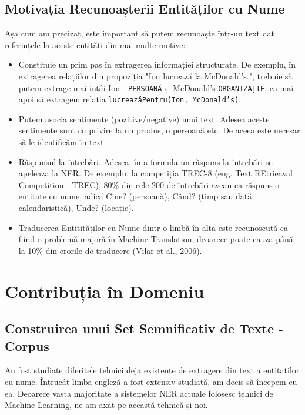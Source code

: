 \subsection{Motivația Recunoașterii Entităților cu Nume}

Așa cum am precizat, este important să putem recunoaște într-un text dat referințele la aceste entități din mai multe motive:

\begin{itemize}
\item Constituie un prim pas în extragerea informației structurate. De exemplu, în extragerea relațiilor din propoziția "Ion lucrează la McDonald's.", trebuie să putem extrage mai intâi Ion - \texttt{PERSOANĂ} și McDonald's \texttt{ORGANIZAȚIE}, ca mai apoi să extragem relația \texttt{lucreazăPentru(Ion, McDonald's)}.
\item Putem asocia sentimente (pozitive/negative) unui text. Adesea aceste sentimente sunt cu privire la un produs, o persoană etc. De aceea este necesar să le identificăm în text.
\item Răspunsul la întrebări. Adesea, în a formula un răspuns la întrebări se apelează la NER. De exemplu, la competiția TREC-8 (eng. Text REtrieaval Competition - TREC), 80\% din cele 200 de întrebări aveau ca răspuns o entitate cu nume, adică Cine? (persoană), Când? (timp sau dată calendaristică), Unde? (locație).\cite{trec8}
\item Traducerea Entitităților cu Nume dintr-o limbă în alta este recunoscută ca fiind o problemă majoră în Machine Translation, deoarece poate cauza până la 10\% din erorile de traducere (Vilar et al., 2006).\cite{vilar2006}
\end{itemize}

\section{Contribuția în Domeniu}
\label{sec:contribution}

\subsection{Construirea unui Set Semnificativ de Texte - Corpus}
\label{sub-sec:corpus-building}

Au fost studiate diferitele tehnici deja existente de extragere din text a entităților cu nume. Întrucât limba engleză a fost extensiv studiată, am decis să începem cu ea. Deoarece vasta majoritate a sistemelor NER actuale folosesc tehnici de Machine Learning, ne-am axat pe această tehnică și noi.

